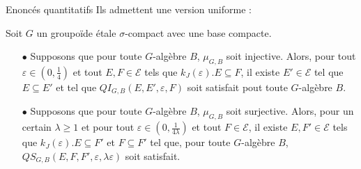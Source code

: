\begin{frame}{Enoncés quantitatifs}
Ils admettent une version uniforme :
\begin{thmfr} Soit $G$ un groupoïde étale $\sigma$-compact avec une base compacte. \\
\begin{itemize}
\item[$\bullet$] Supposons que pour toute $G$-algèbre $B$, $\mu_{G,B}$ soit injective. Alors, pour tout $\varepsilon\in (0,\frac{1}{4})$ et tout $E,F\in\mathcal E$ tels que $k_J(\varepsilon). E\subseteq F$, il existe $E'\in\mathcal E$ tel que $E\subseteq E'$ et tel que $QI_{G,B}(E,E',\varepsilon,F)$ soit satisfait pout toute $G$-algèbre $B$.\\
\item[$\bullet$] Supposons que pour toute $G$-algèbre $B$, $\mu_{G,B}$ soit surjective. Alors, pour un certain $\lambda \geq 1$ et pour tout $\varepsilon\in (0,\frac{1}{4\lambda})$ et tout $F\in\mathcal E$, il existe $E,F'\in\mathcal E$ tels que $k_J(\varepsilon). E\subseteq F'$ et $F\subseteq F'$ tel que, pour toute $G$-algèbre $B$, $QS_{G,B}(E, F,F',\varepsilon,\lambda \varepsilon)$ soit satisfait.
\end{itemize}
\end{thmfr}
\end{frame}


